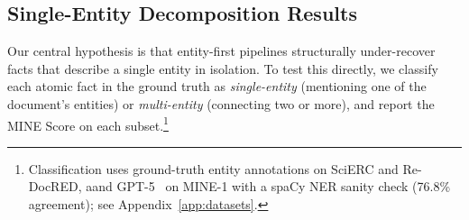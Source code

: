 \documentclass[11pt]{article}
\begin{document}





\subsection{Single-Entity Decomposition Results}
\label{sec:single-entity}
Our central hypothesis is that entity-first pipelines structurally under-recover facts that describe a single entity in isolation. To test this directly, we classify each atomic fact in the ground truth as \emph{single-entity} (mentioning one of the document's entities) or \emph{multi-entity} (connecting two or more), and report the MINE Score on each subset.\footnote{Classification uses ground-truth entity annotations on SciERC and Re-DocRED, aand GPT-5~\citep{gpt5} on MINE-1 with a spaCy NER sanity check (76.8\% agreement); see Appendix~\ref{app:datasets}.}
\end{document}
